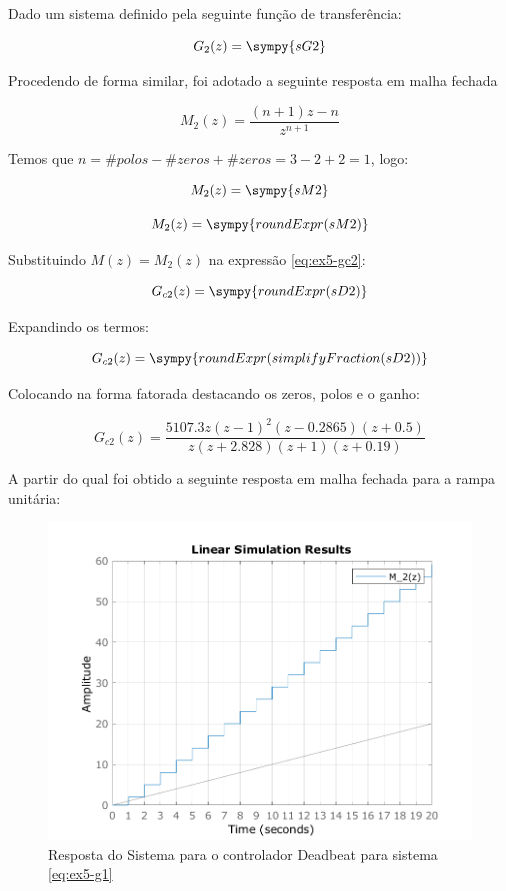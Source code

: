 \documentclass[a4paper,11pt]{article}
\begin{document}
Dado um sistema definido pela seguinte função de transferência:

\begin{equation}\label{eq:ex5-g2}
    G_2(z) = \sympy{sG2}
\end{equation}

Procedendo de forma similar, foi adotado a seguinte resposta em malha fechada

$$
    M_2(z) = \frac{(n+1)z -n}{z^{n+1}}
$$

Temos que $n = \#polos - \#zeros + \#zeros = 3  - 2 + 2 = 1$, logo:

\begin{equation}\label{eq:ex5-g2}
    M_2(z) = \sympy{sM2}
\end{equation}

$$M_2(z) = \sympy{roundExpr(sM2)}$$

Substituindo $M(z) = M_2(z)$ na expressão \ref{eq:ex5-gc2}:

$$G_{c2}(z) = \sympy{roundExpr(sD2)}$$

Expandindo os termos:

$$G_{c2}(z) = \sympy{roundExpr(simplifyFraction(sD2))}$$

Colocando na forma fatorada destacando os zeros, polos e o ganho:

\begin{equation}
    G_{c2}(z) = \frac{5107.3 z (z-1)^2 (z-0.2865) (z+0.5)}{z (z+2.828) (z+1) (z+0.19)}
\end{equation}

A partir do qual foi obtido a seguinte resposta em malha fechada para a rampa unitária:

\begin{figure}[H]
    \centering
    \includegraphics[width=0.6\linewidth]{img/exsim5-g2-deadbeat-sim.png}
    \caption{Resposta do Sistema para o controlador Deadbeat para sistema \ref{eq:ex5-g1}}
\end{figure}
\end{document}

